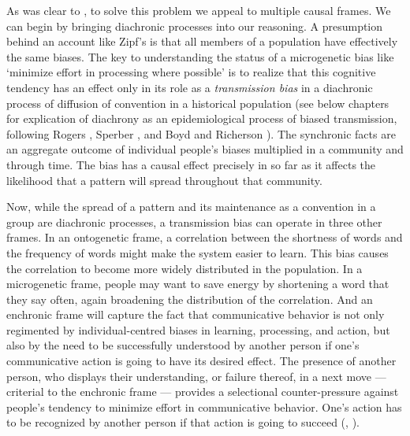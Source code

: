 As was clear to \citet{zipf_human_1949}, to solve this problem we appeal to 
multiple causal frames. We can begin by bringing diachronic processes 
into our reasoning. A presumption behind an account like Zipf's is 
that all members of a population have effectively the same biases. The key to understanding the status of a microgenetic bias like 
\textquoteleft minimize effort in processing where possible' is to realize that this 
cognitive tendency has an effect only in its role as a \textit{transmission bias} in a diachronic process of diffusion of convention 
in a historical population (see below chapters for explication of 
diachrony as an epidemiological process of biased transmission, 
following Rogers \citeyear{rogers_diffusion_2003}, Sperber \citeyear{sperber_anthropology_1985}, and Boyd and Richerson \citeyear{boyd_culture_1985,boyd_origin_2005}). The synchronic facts are an aggregate outcome of individual people's biases multiplied in a community and through time. The bias has a 
causal effect precisely in so far as it affects the likelihood that a
pattern will spread throughout that community. 



Now, while the spread of a pattern and its maintenance as a convention in a group are diachronic processes, a transmission bias can operate in three other frames. In an ontogenetic frame, a correlation between the shortness of words and the frequency of words might make the system easier to learn. This bias causes the correlation to become more widely distributed in the population. In a microgenetic frame, people may want to save energy by shortening a word that they say often, again broadening the distribution of the correlation. And an enchronic frame will capture the fact that communicative behavior is not only regimented by individual-centred biases in learning, processing, and action, but also by the need to be successfully understood by another person if one's communicative action is going to have its desired effect. The presence of another person, who displays their understanding, or failure thereof, in a next move --- criterial to the enchronic frame --- provides a selectional counter-pressure against people's tendency to minimize effort in communicative behavior. One's action has to be recognized by another person if that action is going to succeed (\citealt[21]{zipf_human_1949}, \citealt[Chapter 9]{enfield_relationship_2013}).



